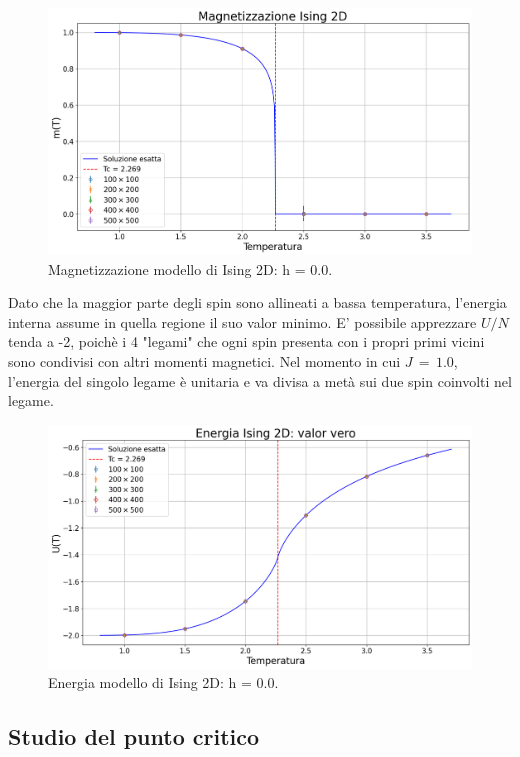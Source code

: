 \begin{figure}[H]
    \centering
    \includegraphics[width=\textwidth]{Immagini/simIsing2D/magn.png}
    \caption{Magnetizzazione modello di Ising 2D: h = 0.0.}
    \label{fig: magn_Ising2D}
\end{figure}

Dato che la maggior parte degli spin sono allineati a bassa temperatura, l'energia interna assume in quella regione il suo valor minimo. 
E' possibile apprezzare $U/N$ tenda a -2, poichè i 4 "legami" che ogni spin presenta con i propri primi vicini sono condivisi con altri 
momenti magnetici. Nel momento in cui $J\,=\,1.0$, l'energia del singolo legame è unitaria e va divisa a metà sui due spin coinvolti nel 
legame.

\begin{figure}[H]
    \centering
    \includegraphics[width=\textwidth]{Immagini/simIsing2D/ene.png}
    \caption{Energia modello di Ising 2D: h = 0.0.}
    \label{fig: ene_Ising2D}
\end{figure}



\subsection{Studio del punto critico}
